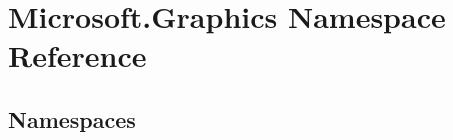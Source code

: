 \hypertarget{namespace_microsoft_1_1_graphics}{}\section{Microsoft.\+Graphics Namespace Reference}
\label{namespace_microsoft_1_1_graphics}
\subsection*{Namespaces}
\begin{DoxyCompactItemize}
\end{DoxyCompactItemize}
